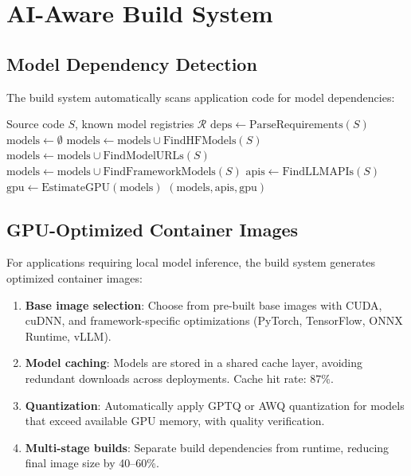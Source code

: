 \section{AI-Aware Build System}

\label{sec:build}

\subsection{Model Dependency Detection}

The build system automatically scans application code for model dependencies:

\begin{algorithm}[H]
\caption{Model Dependency Detection}
\label{alg:detect}
\begin{algorithmic}[1]
\Require Source code $S$, known model registries $\mathcal{R}$
\State $\text{deps} \gets \text{ParseRequirements}(S)$ 
\State $\text{models} \gets \emptyset$
\State {}
\State $\text{models} \gets \text{models} \cup \text{FindHFModels}(S)$
\State {}
\State $\text{models} \gets \text{models} \cup \text{FindModelURLs}(S)$
\State {}
\State $\text{models} \gets \text{models} \cup \text{FindFrameworkModels}(S)$
\State {}
\State $\text{apis} \gets \text{FindLLMAPIs}(S)$
\State {}
\State $\text{gpu} \gets \text{EstimateGPU}(\text{models})$
\State \Return $(\text{models}, \text{apis}, \text{gpu})$
\end{algorithmic}
\end{algorithm}

\subsection{GPU-Optimized Container Images}

For applications requiring local model inference, the build system generates optimized container images:

\begin{enumerate}[leftmargin=1.4em]
    \item \textbf{Base image selection}: Choose from pre-built base images with CUDA, cuDNN, and framework-specific optimizations (PyTorch, TensorFlow, ONNX Runtime, vLLM).
    \item \textbf{Model caching}: Models are stored in a shared cache layer, avoiding redundant downloads across deployments. Cache hit rate: 87\%.
    \item \textbf{Quantization}: Automatically apply GPTQ or AWQ quantization for models that exceed available GPU memory, with quality verification.
    \item \textbf{Multi-stage builds}: Separate build dependencies from runtime, reducing final image size by 40--60\%.
\end{enumerate}

